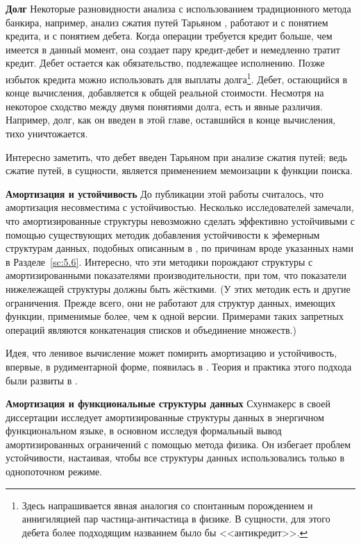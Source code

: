 \noindent
\textbf{Долг} Некоторые разновидности анализа с использованием
традиционного метода банкира, например, анализ сжатия путей Тарьяном
\cite{Tarjan1983}, работают и с понятием кредита, и с понятием
дебета.  Когда операции требуется кредит больше, чем имеется в данный
момент, она создает пару кредит-дебет и немедленно тратит
кредит. Дебет остается как обязательство, подлежащее исполнению. Позже
избыток кредита можно использовать для выплаты долга\footnote{Здесь
  напрашивается явная аналогия со спонтанным порождением и
  аннигиляцией пар частица-античастица в физике. В сущности, для этого
  дебета более подходящим названием было бы <<антикредит>>.
}.
Дебет, остающийся в конце вычисления, добавляется к общей реальной
стоимости. Несмотря на некоторое сходство между двумя понятиями долга,
есть и явные различия. Например, долг, как он введен в этой главе,
оставшийся в конце вычисления, тихо уничтожается.

Интересно заметить, что дебет введен Тарьяном при анализе сжатия
путей; ведь сжатие путей, в сущности, является применением мемоизации
к функции поиска.

\noindent
\textbf{Амортизация и устойчивость} До публикации этой работы
считалось, что амортизация несовместима с устойчивостью.  Несколько
исследователей \cite{DriscollSleatorTarjan1994, Raman1992} замечали,
что амортизированные структуры невозможно сделать эффективно
устойчивыми с помощью существующих методик добавления устойчивости к
эфемерным структурам данных, подобных описанным в
\cite{Driscoll-etal1989, Dietz1989}, по причинам вроде указанных нами в
Разделе~\ref{sc:5.6}. Интересно, что эти методики порождают структуры
с амортизированными показателями производительности, при том, что
показатели нижележащей структуры должны быть жёсткими. (У этих методик
есть и другие ограничения. Прежде всего, они не работают для структур
данных, имеющих функции, применимые более, чем к одной
версии. Примерами таких запретных операций являются конкатенация
списков и объединение множеств.)

Идея, что ленивое вычисление может помирить амортизацию и устойчивость,
впервые, в рудиментарной форме, появилась в
\cite{Okasaki1995c}. Теория и практика этого подхода были развиты в
\cite{Okasaki1995a, Okasaki1996b}.

\noindent
\textbf{Амортизация и функциональные структуры данных} Схунмакерс
\cite{Schoenmakers1993} в своей диссертации исследует амортизированные
структуры данных в энергичном функциональном языке, в основном
исследуя формальный вывод амортизированных ограничений с помощью
метода физика. Он избегает проблем устойчивости, настаивая, чтобы все
структуры данных использовались только в однопоточном режиме.

